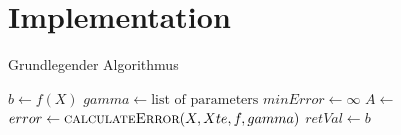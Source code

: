 \chapter{Implementation}
\label{cha:Implementation}

\begin{algorithm}
\caption{Grundlegender Algorithmus}
\begin{algorithmic}[1]
\State $b \gets f(X)$
\State $gamma \gets \text{list of parameters}$
\State $minError \gets \infty$
	\State $A \gets$ 
	\State $error \gets \Call{calculateError}{X, Xte, f, gamma}$
		$retVal \gets b$
	\EndIf
\EndFor
\State {}
\EndFunction
\end{algorithmic}
\end{algorithm}